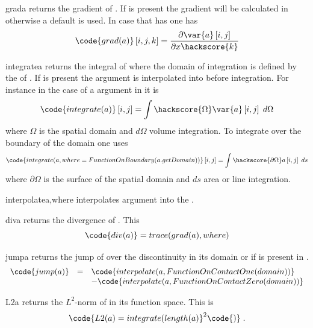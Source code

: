 \begin{funcdesc}{grad}{a}
returns the gradient of . If  is present the gradient will be calculated in \FunctionSpace {} otherwise a 
default \FunctionSpace is used. In case that  has \RankTwo one has
\begin{equation}
\code{grad(a)}\left[i,j,k\right]=\frac{\partial \var{a} \left[i,j\right]}{\partial x\hackscore{k}}
\end{equation} 
\end{funcdesc}
\begin{funcdesc}{integrate}{a}
returns the integral of  where the domain of integration is defined by the \FunctionSpace of . If  is 
present the argument is interpolated into \FunctionSpace {} before integration. For instance in the case of 
a \RankTwo argument in \ContinuousFunction it is
\begin{equation}
\code{integrate(a)}\left[i,j\right]=\int\hackscore{\Omega}\var{a} \left[i,j\right] \; d\Omega
\end{equation} 
where $\Omega$ is the spatial domain and $d\Omega$ volume integration. To integrate over the boundary of the domain one uses  
\begin{equation}
\code{integrate(a,where=FunctionOnBoundary(a.getDomain))}\left[i,j\right]=\int\hackscore{\partial \Omega} a\left[i,j\right] \; ds
\end{equation} 
where $\partial \Omega$ is the surface of the spatial domain and $ds$ area or line integration.
\end{funcdesc}
\begin{funcdesc}{interpolate}{a,where}
interpolates argument  into the \FunctionSpace {}. 
\end{funcdesc}
\begin{funcdesc}{div}{a}
returns the divergence of . This 
\begin{equation}
\code{div(a)}=trace(grad(a),where)
\end{equation}
\end{funcdesc}
\begin{funcdesc}{jump}{a}
returns the jump of  over the discontinuity in its domain or if \Domain {} is present
in .
\begin{equation}
\begin{array}{rcl}
\code{jump(a)}& = &\code{interpolate(a,FunctionOnContactOne(domain))} \\
              &   & \hfill - \code{interpolate(a,FunctionOnContactZero(domain))}
\end{array}
\end{equation}
\end{funcdesc}
\begin{funcdesc}{L2}{a}
returns the $L^2$-norm of  in its function space. This is 
\begin{equation}
\code{L2(a)=integrate(length(a)}^2\code{)} \; .
\end{equation} 
\end{funcdesc}

